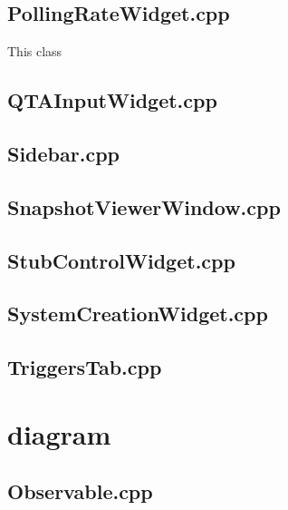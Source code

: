 \subsection{PollingRateWidget.cpp}
This class


\subsection{QTAInputWidget.cpp}


\subsection{Sidebar.cpp}


\subsection{SnapshotViewerWindow.cpp}


\subsection{StubControlWidget.cpp}


\subsection{SystemCreationWidget.cpp}


\subsection{TriggersTab.cpp}


\section{diagram}

\subsection{Observable.cpp}


